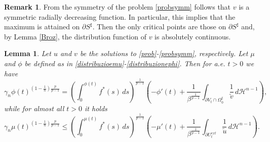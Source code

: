 \documentclass[12pt]{article}
\theoremstyle{definition}
\theoremstyle{plain}
\newtheorem{lemma}[teorema]{Lemma}
\theoremstyle{definition}
\newtheorem{oss}[esempio]{Remark}
\begin{document}
\begin{oss}\label{brotherziemer}
    From the symmetry of the problem \eqref{probsymm} follows that $v$ is a symmetric radially decreasing function. In particular, this implies that the maximum is attained on $\partial S^\sharp$. Then the only critical points are those on $\partial S^\sharp$ and,
    by Lemma \ref{Broz}, the distribution function of $v$ is absolutely continuous. 
\end{oss}
\begin{lemma}
    Let $u$ and $v$ be the solutions to \eqref{prob}-\eqref{probsymm}, respectively. Let $\mu$ and $\phi$ be defined as in \eqref{distribuzioemu}-\eqref{distribuzionephi}. Then for a.e. $t>0$ we have
    \begin{equation}\label{compsymm}
        \gamma_n\phi(t)^{\left(1-\frac{1}{n}\right)\frac{p}{p-1}}=\left(\int_0^{\phi(t)}f^\ast(s)\,ds\right)^\frac{1}{p-1}\left(- \phi'(t)+\frac{1}{\beta^\frac{1}{p-1}}\int_{\partial V_t\cap\Omega_0^\sharp}\frac{1}{\tilde v}\,d\mathcal{H}^{n-1}\right),
    \end{equation}
    while for almost all $t>0$ it holds
    \begin{equation}\label{comp}
        \gamma_n\mu(t)^{\left(1-\frac{1}{n}\right)\frac{p}{p-1}}\leq\left(\int_0^{\mu(t)}f^\ast(s)\,ds\right)^\frac{1}{p-1}\left(- \mu'(t)+\frac{1}{\beta^\frac{1}{p-1}}\int_{\partial U^{ext}_t}\frac{1}{\tilde u}\,d\mathcal{H}^{n-1}\right).
    \end{equation}
\end{lemma}
\end{document}
